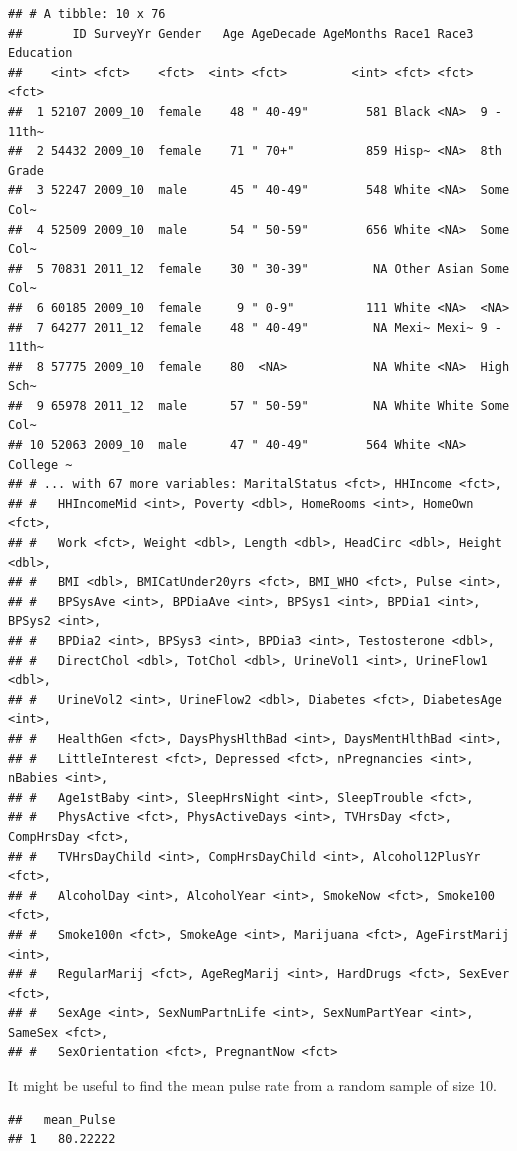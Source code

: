 \documentclass[
]{book}
\begin{document}
\begin{verbatim}
## # A tibble: 10 x 76
##       ID SurveyYr Gender   Age AgeDecade AgeMonths Race1 Race3 Education
##    <int> <fct>    <fct>  <int> <fct>         <int> <fct> <fct> <fct>    
##  1 52107 2009_10  female    48 " 40-49"        581 Black <NA>  9 - 11th~
##  2 54432 2009_10  female    71 " 70+"          859 Hisp~ <NA>  8th Grade
##  3 52247 2009_10  male      45 " 40-49"        548 White <NA>  Some Col~
##  4 52509 2009_10  male      54 " 50-59"        656 White <NA>  Some Col~
##  5 70831 2011_12  female    30 " 30-39"         NA Other Asian Some Col~
##  6 60185 2009_10  female     9 " 0-9"          111 White <NA>  <NA>     
##  7 64277 2011_12  female    48 " 40-49"         NA Mexi~ Mexi~ 9 - 11th~
##  8 57775 2009_10  female    80  <NA>            NA White <NA>  High Sch~
##  9 65978 2011_12  male      57 " 50-59"         NA White White Some Col~
## 10 52063 2009_10  male      47 " 40-49"        564 White <NA>  College ~
## # ... with 67 more variables: MaritalStatus <fct>, HHIncome <fct>,
## #   HHIncomeMid <int>, Poverty <dbl>, HomeRooms <int>, HomeOwn <fct>,
## #   Work <fct>, Weight <dbl>, Length <dbl>, HeadCirc <dbl>, Height <dbl>,
## #   BMI <dbl>, BMICatUnder20yrs <fct>, BMI_WHO <fct>, Pulse <int>,
## #   BPSysAve <int>, BPDiaAve <int>, BPSys1 <int>, BPDia1 <int>, BPSys2 <int>,
## #   BPDia2 <int>, BPSys3 <int>, BPDia3 <int>, Testosterone <dbl>,
## #   DirectChol <dbl>, TotChol <dbl>, UrineVol1 <int>, UrineFlow1 <dbl>,
## #   UrineVol2 <int>, UrineFlow2 <dbl>, Diabetes <fct>, DiabetesAge <int>,
## #   HealthGen <fct>, DaysPhysHlthBad <int>, DaysMentHlthBad <int>,
## #   LittleInterest <fct>, Depressed <fct>, nPregnancies <int>, nBabies <int>,
## #   Age1stBaby <int>, SleepHrsNight <int>, SleepTrouble <fct>,
## #   PhysActive <fct>, PhysActiveDays <int>, TVHrsDay <fct>, CompHrsDay <fct>,
## #   TVHrsDayChild <int>, CompHrsDayChild <int>, Alcohol12PlusYr <fct>,
## #   AlcoholDay <int>, AlcoholYear <int>, SmokeNow <fct>, Smoke100 <fct>,
## #   Smoke100n <fct>, SmokeAge <int>, Marijuana <fct>, AgeFirstMarij <int>,
## #   RegularMarij <fct>, AgeRegMarij <int>, HardDrugs <fct>, SexEver <fct>,
## #   SexAge <int>, SexNumPartnLife <int>, SexNumPartYear <int>, SameSex <fct>,
## #   SexOrientation <fct>, PregnantNow <fct>
\end{verbatim}

It might be useful to find the mean pulse rate from a random sample of size 10.

\begin{verbatim}
##   mean_Pulse
## 1   80.22222
\end{verbatim}
\end{document}
